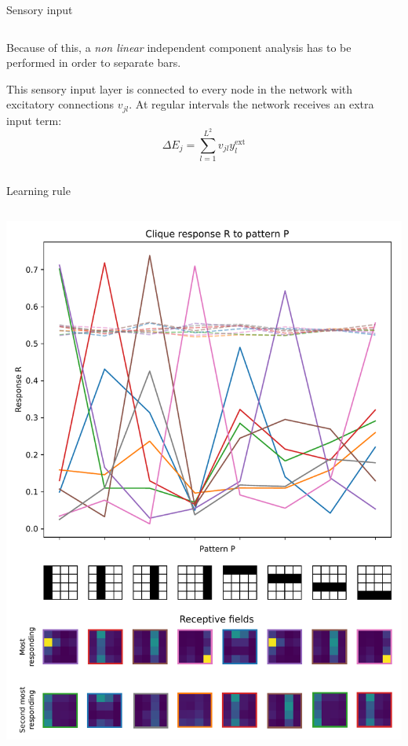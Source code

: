 \documentclass[final,hyperref={pdfpagelabels=false}]{beamer}
\begin{document}
\begin{frame}
\begin{columns}
\begin{column}{.64\textwidth}
\begin{minipage}[T]{.95\textwidth}
{\begin{block}{Sensory input}
\begin{columns}
\begin{column}[T]{.9\textwidth}
				Because of this, a \emph{non linear} independent component analysis has to be performed in order to separate bars.
					
				This sensory input layer is connected to every node in the network with excitatory connections $v_{jl}$. At regular intervals the network receives an extra input term:
				\begin{equation*}
					\Delta E_j = \sum_{l=1}^{L^2} v_{jl} y_l^{\text{ext}}
				\end{equation*}


			

			\end{column}

			\end{columns}

				

			\end{block}
			
			\begin{block}{Learning rule}
			\begin{columns}
				\begin{column}[T]{.4\textwidth}

					\includegraphics[width=1\linewidth]{complete2.pdf}	
				\end{column}								
				

\end{columns}
\end{block}}
\end{minipage}
\end{column}
\end{columns}
\end{frame}
\end{document}
